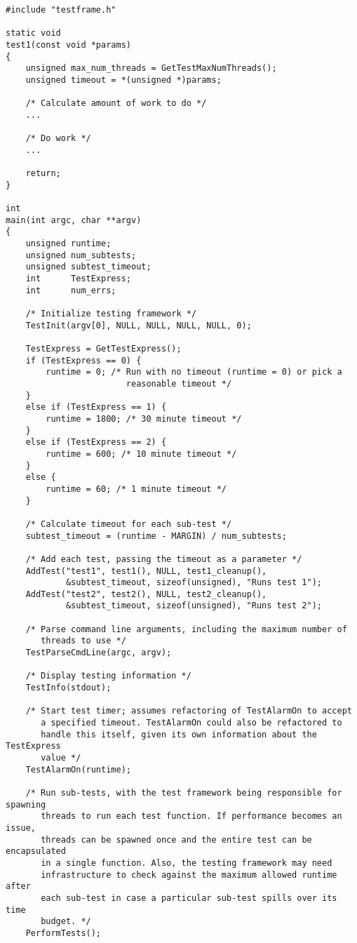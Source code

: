 \documentclass[../HDF5_RFC.tex]{subfiles}
\begin{document}
\begin{verbatim}
#include "testframe.h"

static void
test1(const void *params)
{
    unsigned max_num_threads = GetTestMaxNumThreads();
    unsigned timeout = *(unsigned *)params;

    /* Calculate amount of work to do */
    ...

    /* Do work */
    ...

    return;
}

int
main(int argc, char **argv)
{
    unsigned runtime;
    unsigned num_subtests;
    unsigned subtest_timeout;
    int      TestExpress;
    int      num_errs;

    /* Initialize testing framework */
    TestInit(argv[0], NULL, NULL, NULL, NULL, 0);

    TestExpress = GetTestExpress();
    if (TestExpress == 0) {
        runtime = 0; /* Run with no timeout (runtime = 0) or pick a
                        reasonable timeout */
    }
    else if (TestExpress == 1) {
        runtime = 1800; /* 30 minute timeout */
    }
    else if (TestExpress == 2) {
        runtime = 600; /* 10 minute timeout */
    }
    else {
        runtime = 60; /* 1 minute timeout */
    }

    /* Calculate timeout for each sub-test */
    subtest_timeout = (runtime - MARGIN) / num_subtests;

    /* Add each test, passing the timeout as a parameter */
    AddTest("test1", test1(), NULL, test1_cleanup(),
            &subtest_timeout, sizeof(unsigned), "Runs test 1");
    AddTest("test2", test2(), NULL, test2_cleanup(),
            &subtest_timeout, sizeof(unsigned), "Runs test 2");

    /* Parse command line arguments, including the maximum number of
       threads to use */
    TestParseCmdLine(argc, argv);

    /* Display testing information */
    TestInfo(stdout);

    /* Start test timer; assumes refactoring of TestAlarmOn to accept
       a specified timeout. TestAlarmOn could also be refactored to
       handle this itself, given its own information about the TestExpress
       value */
    TestAlarmOn(runtime);

    /* Run sub-tests, with the test framework being responsible for spawning
       threads to run each test function. If performance becomes an issue,
       threads can be spawned once and the entire test can be encapsulated
       in a single function. Also, the testing framework may need
       infrastructure to check against the maximum allowed runtime after
       each sub-test in case a particular sub-test spills over its time
       budget. */
    PerformTests();


\end{verbatim}
\end{document}
